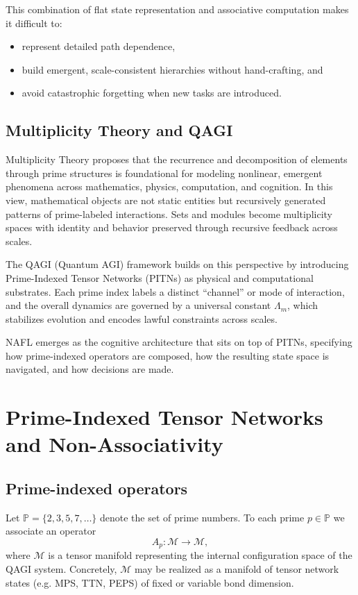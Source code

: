 \documentclass[11pt]{article}
\newcommand{\Mcal}{\mathcal{M}}
\newcommand{\Lm}{\Lambda_m}
\begin{document}
This combination of flat state representation and associative computation makes it difficult to:
\begin{itemize}[nosep]
    \item represent detailed path dependence,
    \item build emergent, scale-consistent hierarchies without hand-crafting, and
    \item avoid catastrophic forgetting when new tasks are introduced.
\end{itemize}

\subsection{Multiplicity Theory and QAGI}

Multiplicity Theory proposes that the recurrence and decomposition of elements through prime structures is foundational for modeling nonlinear, emergent phenomena across mathematics, physics, computation, and cognition.
In this view, mathematical objects are not static entities but recursively generated patterns of prime-labeled interactions.
Sets and modules become multiplicity spaces with identity and behavior preserved through recursive feedback across scales.

The QAGI (Quantum AGI) framework builds on this perspective by introducing Prime-Indexed Tensor Networks (PITNs) as physical and computational substrates.
Each prime index labels a distinct ``channel'' or mode of interaction, and the overall dynamics are governed by a universal constant \(\Lm\), which stabilizes evolution and encodes lawful constraints across scales.

NAFL emerges as the cognitive architecture that sits on top of PITNs, specifying how prime-indexed operators are composed, how the resulting state space is navigated, and how decisions are made.

\section{Prime-Indexed Tensor Networks and Non-Associativity}

\subsection{Prime-indexed operators}

Let \(\mathbb{P} = \{2,3,5,7,\dots\}\) denote the set of prime numbers.
To each prime \(p \in \mathbb{P}\) we associate an operator
\[
A_p : \Mcal \to \Mcal,
\]
where \(\Mcal\) is a tensor manifold representing the internal configuration space of the QAGI system.
Concretely, \(\Mcal\) may be realized as a manifold of tensor network states (e.g. MPS, TTN, PEPS) of fixed or variable bond dimension.
\end{document}
